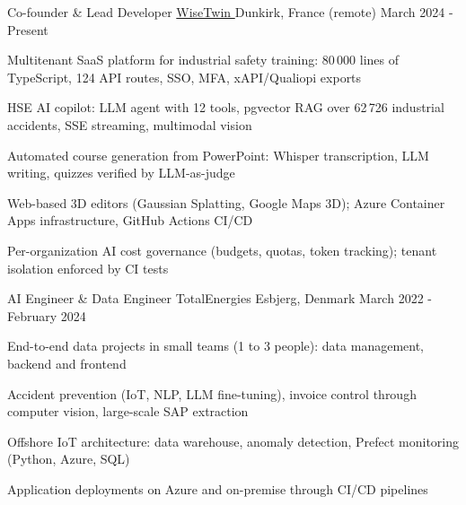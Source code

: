 


\begin{cventries}


\cventry
{Co-founder \& Lead Developer} %
{\href{https://www.wisetwin.eu}{WiseTwin {\tiny\textcolor{black}{\faExternalLink}}}} %
{Dunkirk, France (remote)} %
{March 2024 - Present} %
{ %
\begin{cvitems}
\item {Multitenant SaaS platform for industrial safety training: 80\,000 lines of TypeScript, 124 API routes, SSO, MFA, xAPI/Qualiopi exports}
\item {HSE AI copilot: LLM agent with 12 tools, pgvector RAG over 62\,726 industrial accidents, SSE streaming, multimodal vision}
\item {Automated course generation from PowerPoint: Whisper transcription, LLM writing, quizzes verified by LLM-as-judge}
\item {Web-based 3D editors (Gaussian Splatting, Google Maps 3D); Azure Container Apps infrastructure, GitHub Actions CI/CD}
\item {Per-organization AI cost governance (budgets, quotas, token tracking); tenant isolation enforced by CI tests}
\end{cvitems}
}
\vspace{1em}


\cventry
{AI Engineer \& Data Engineer} %
{TotalEnergies} %
{Esbjerg, Denmark} %
{March 2022 - February 2024} %
{ %
\begin{cvitems}
\item {End-to-end data projects in small teams (1 to 3 people): data management, backend and frontend}
\item {Accident prevention (IoT, NLP, LLM fine-tuning), invoice control through computer vision, large-scale SAP extraction}
\item {Offshore IoT architecture: data warehouse, anomaly detection, Prefect monitoring (Python, Azure, SQL)}
\item {Application deployments on Azure and on-premise through CI/CD pipelines}
\end{cvitems}
}
\vspace{1em}


\end{cventries}
